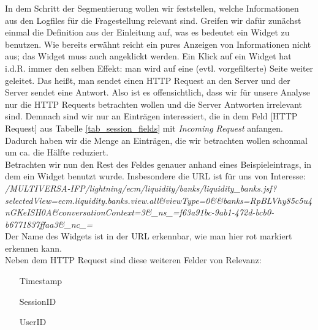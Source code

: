 In dem Schritt der Segmentierung wollen wir feststellen, welche Informationen aus den Logfiles für die Fragestellung relevant sind. Greifen wir dafür zunächst einmal die Definition aus der Einleitung auf, was es bedeutet ein Widget zu benutzen. Wie bereits erwähnt reicht ein pures Anzeigen von Informationen nicht aus; das Widget muss auch angeklickt werden. Ein Klick auf ein Widget hat i.d.R. immer den selben Effekt: man wird auf eine (evtl. vorgefilterte) Seite weiter geleitet. Das heißt, man sendet einen HTTP Request an den Server und der Server sendet eine Antwort. Also ist es offensichtlich, dass wir für unsere Analyse nur die HTTP Requests betrachten wollen und die Server Antworten irrelevant sind. Demnach sind wir nur an Einträgen interessiert, die in dem Feld [HTTP Request] aus Tabelle \ref{tab_session_fields} mit \textit{Incoming Request} anfangen. Dadurch haben wir die Menge an Einträgen, die wir betrachten wollen schonmal um ca. die Hälfte reduziert.\\
Betrachten wir nun den Rest des Feldes genauer anhand eines Beispieleintrags, in dem ein Widget benutzt wurde. Insbesondere die URL ist für uns von Interesse:\\
\textit{/MULTIVERSA-IFP/lightning/ecm/liquidity/banks/liquidity\_banks.jsf?selectedView=ecm.liquidity.banks.view.all\&viewType=0\&\&banks=RpBLVhy85c5u4nGKeISH0A\&conversationContext=3\&\_ns\_=f63a91bc-9ab1-472d-bcb0-b6771837ffaa3\&\_nc\_=}\\
Der Name des Widgets ist in der URL erkennbar, wie man hier rot markiert erkennen kann.\\
Neben dem HTTP Request sind diese weiteren Felder von Relevanz:
\begin{itemize}
	\item [Timestamp]
	\item [SessionID]
	\item [UserID]
\end{itemize}

